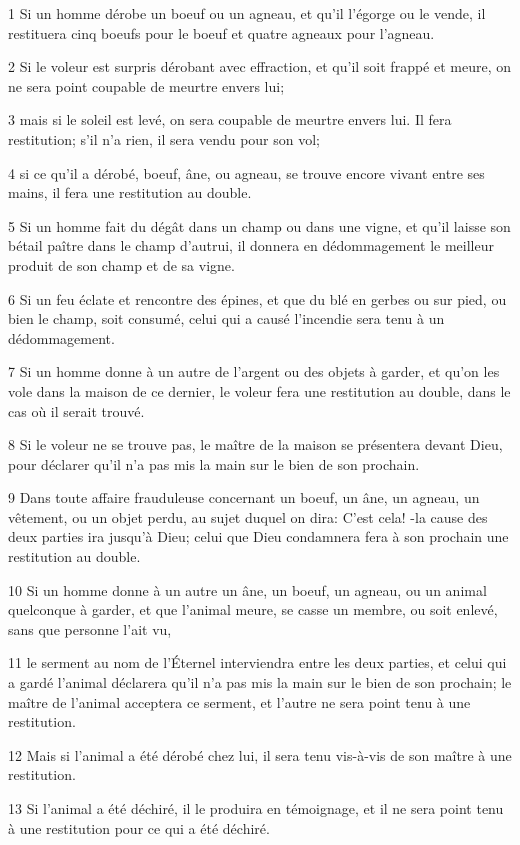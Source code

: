 \par 1 Si un homme dérobe un boeuf ou un agneau, et qu'il l'égorge ou le vende, il restituera cinq boeufs pour le boeuf et quatre agneaux pour l'agneau.
\par 2 Si le voleur est surpris dérobant avec effraction, et qu'il soit frappé et meure, on ne sera point coupable de meurtre envers lui;
\par 3 mais si le soleil est levé, on sera coupable de meurtre envers lui. Il fera restitution; s'il n'a rien, il sera vendu pour son vol;
\par 4 si ce qu'il a dérobé, boeuf, âne, ou agneau, se trouve encore vivant entre ses mains, il fera une restitution au double.
\par 5 Si un homme fait du dégât dans un champ ou dans une vigne, et qu'il laisse son bétail paître dans le champ d'autrui, il donnera en dédommagement le meilleur produit de son champ et de sa vigne.
\par 6 Si un feu éclate et rencontre des épines, et que du blé en gerbes ou sur pied, ou bien le champ, soit consumé, celui qui a causé l'incendie sera tenu à un dédommagement.
\par 7 Si un homme donne à un autre de l'argent ou des objets à garder, et qu'on les vole dans la maison de ce dernier, le voleur fera une restitution au double, dans le cas où il serait trouvé.
\par 8 Si le voleur ne se trouve pas, le maître de la maison se présentera devant Dieu, pour déclarer qu'il n'a pas mis la main sur le bien de son prochain.
\par 9 Dans toute affaire frauduleuse concernant un boeuf, un âne, un agneau, un vêtement, ou un objet perdu, au sujet duquel on dira: C'est cela! -la cause des deux parties ira jusqu'à Dieu; celui que Dieu condamnera fera à son prochain une restitution au double.
\par 10 Si un homme donne à un autre un âne, un boeuf, un agneau, ou un animal quelconque à garder, et que l'animal meure, se casse un membre, ou soit enlevé, sans que personne l'ait vu,
\par 11 le serment au nom de l'Éternel interviendra entre les deux parties, et celui qui a gardé l'animal déclarera qu'il n'a pas mis la main sur le bien de son prochain; le maître de l'animal acceptera ce serment, et l'autre ne sera point tenu à une restitution.
\par 12 Mais si l'animal a été dérobé chez lui, il sera tenu vis-à-vis de son maître à une restitution.
\par 13 Si l'animal a été déchiré, il le produira en témoignage, et il ne sera point tenu à une restitution pour ce qui a été déchiré.
